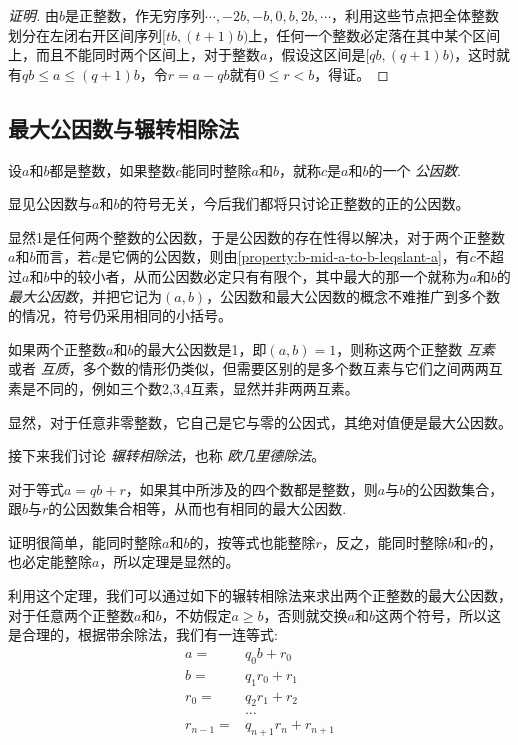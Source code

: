 \begin{proof}[证明]
  由$b$是正整数，作无穷序列$\cdots, -2b, -b, 0, b, 2b,\cdots$，利用这些节点把全体整数划分在左闭右开区间序列$[tb, (t+1)b)$上，任何一个整数必定落在其中某个区间上，而且不能同时两个区间上，对于整数$a$，假设这区间是$[qb, (q+1)b)$，这时就有$qb \leqslant a \leqslant (q+1)b$，令$r=a-qb$就有$0 \leqslant r < b$，得证。
\end{proof}

\subsection{最大公因数与辗转相除法}
\label{sec:greatest-common-factor}

\begin{definition}
  设$a$和$b$都是整数，如果整数$c$能同时整除$a$和$b$，就称$c$是$a$和$b$的一个 \emph{公因数}.
\end{definition}

显见公因数与$a$和$b$的符号无关，今后我们都将只讨论正整数的正的公因数。

显然1是任何两个整数的公因数，于是公因数的存在性得以解决，对于两个正整数$a$和$b$而言，若$c$是它俩的公因数，则由\autoref{property:b-mid-a-to-b-leqslant-a}，有$c$不超过$a$和$b$中的较小者，从而公因数必定只有有限个，其中最大的那一个就称为$a$和$b$的 \emph{最大公因数}，并把它记为$(a,b)$，公因数和最大公因数的概念不难推广到多个数的情况，符号仍采用相同的小括号。

如果两个正整数$a$和$b$的最大公因数是1，即$(a,b)=1$，则称这两个正整数 \emph{互素} 或者 \emph{互质}，多个数的情形仍类似，但需要区别的是多个数互素与它们之间两两互素是不同的，例如三个数2,3,4互素，显然并非两两互素。

显然，对于任意非零整数，它自己是它与零的公因式，其绝对值便是最大公因数。

接下来我们讨论 \emph{辗转相除法}，也称 \emph{欧几里德除法}。

\begin{theorem}
  对于等式$a=qb+r$，如果其中所涉及的四个数都是整数，则$a$与$b$的公因数集合，跟$b$与$r$的公因数集合相等，从而也有相同的最大公因数.
\end{theorem}

证明很简单，能同时整除$a$和$b$的，按等式也能整除$r$，反之，能同时整除$b$和$r$的，也必定能整除$a$，所以定理是显然的。

利用这个定理，我们可以通过如下的辗转相除法来求出两个正整数的最大公因数，对于任意两个正整数$a$和$b$，不妨假定$a \geqslant b$，否则就交换$a$和$b$这两个符号，所以这是合理的，根据带余除法，我们有一连等式:
\begin{align*}
  a  ={} & q_0 b + r_0 \\
  b  ={} &q_1 r_0 + r_1 \\
  r_0  ={}  &q_2 r_1 + r_2 \\
    {}&\ldots \\
  r_{n-1}  ={} &q_{n+1} r_n + r_{n+1}
\end{align*}

